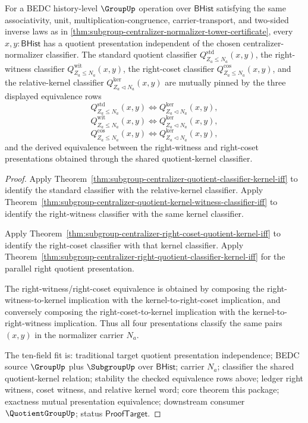 \begin{theorem}
\label{thm:subgroup-centralizer-quotient-presentation-equivalence-package}
For a BEDC history-level $\GroupUp$ operation over $\mathsf{BHist}$
satisfying the same associativity, unit, multiplication-congruence,
carrier-transport, and two-sided inverse laws as in
\autoref{thm:subgroup-centralizer-normalizer-tower-certificate}, every
$x,y:\mathsf{BHist}$ has a quotient presentation independent of the chosen
centralizer-normalizer classifier. The standard quotient classifier
$Q^{\mathrm{std}}_{Z_a\leq N_a}(x,y)$, the right-witness classifier
$Q^{\mathrm{wit}}_{Z_a\leq N_a}(x,y)$, the right-coset classifier
$Q^{\mathrm{cos}}_{Z_a\leq N_a}(x,y)$, and the relative-kernel classifier
$Q^{\mathrm{ker}}_{Z_a\triangleleft N_a}(x,y)$ are mutually pinned by the
three displayed equivalence rows
$$
Q^{\mathrm{std}}_{Z_a\leq N_a}(x,y)\Longleftrightarrow
Q^{\mathrm{ker}}_{Z_a\triangleleft N_a}(x,y),
$$
$$
Q^{\mathrm{wit}}_{Z_a\leq N_a}(x,y)\Longleftrightarrow
Q^{\mathrm{ker}}_{Z_a\triangleleft N_a}(x,y),
$$
$$
Q^{\mathrm{cos}}_{Z_a\leq N_a}(x,y)\Longleftrightarrow
Q^{\mathrm{ker}}_{Z_a\triangleleft N_a}(x,y),
$$
and the derived equivalence between the right-witness and right-coset
presentations obtained through the shared quotient-kernel classifier.
\end{theorem}
\begin{proof}
Apply Theorem~\ref{thm:subgroup-centralizer-quotient-classifier-kernel-iff}
to identify the standard classifier with the relative-kernel classifier.
Apply Theorem~\ref{thm:subgroup-centralizer-quotient-kernel-witness-classifier-iff}
to identify the right-witness classifier with the same kernel classifier.

Apply Theorem~\ref{thm:subgroup-centralizer-right-coset-quotient-kernel-iff}
to identify the right-coset classifier with that kernel classifier. Apply
Theorem~\ref{thm:subgroup-centralizer-right-quotient-classifier-kernel-iff}
for the parallel right quotient presentation.

The right-witness/right-coset equivalence is obtained by composing the
right-witness-to-kernel implication with the kernel-to-right-coset implication,
and conversely composing the right-coset-to-kernel implication with the
kernel-to-right-witness implication. Thus all four presentations classify the
same pairs $(x,y)$ in the normalizer carrier $N_a$.

The ten-field fit is: traditional target quotient presentation independence;
BEDC source $\GroupUp$ plus $\SubgroupUp$ over $\mathsf{BHist}$; carrier
$N_a$; classifier the shared quotient-kernel relation; stability the checked
equivalence rows above; ledger right witness, coset witness, and relative
kernel word; core theorem this package; exactness mutual presentation
equivalence; downstream consumer $\QuotientGroupUp$; status
$\mathsf{ProofTarget}$.
\end{proof}

